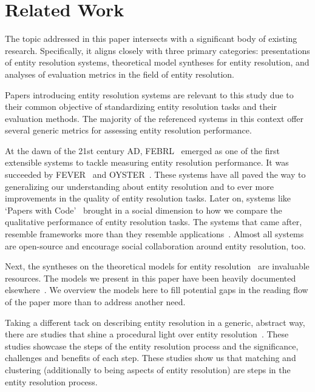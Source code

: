 \documentclass[journal]{IEEEtran}
\begin{document}
    \section{Related Work}\label{sec:Related Work}
    
    The topic addressed in this paper intersects with a significant body of
    existing research.
    Specifically, it aligns closely with three primary categories: presentations
    of entity resolution systems, theoretical model syntheses for entity
    resolution, and analyses of evaluation metrics in the field of entity
    resolution.

    Papers introducing entity resolution systems are relevant to this study due
    to their common objective of standardizing entity resolution tasks and their
    evaluation methods.
    The majority of the referenced systems in this context offer several generic
    metrics for assessing entity resolution performance.

    At the dawn of the 21st century AD, FEBRL~\cite{febrl2002} emerged as one of
    the first extensible systems to tackle measuring entity resolution
    performance.
    It was succeeded by FEVER~\cite{fever2009} and OYSTER~\cite{oyster2012}.
    These systems have all paved the way to generalizing our understanding about
    entity resolution and to ever more improvements in the quality of entity
    resolution tasks.
    Later on, systems like `Papers with Code'~\cite{papwithcode2019} brought in
    a social dimension to how we compare the qualitative performance of entity
    resolution tasks.
    The systems that came after, resemble frameworks more than they resemble
    applications~\cite{magellan2020,jedai2017}.
    Almost all systems are open-source and encourage social collaboration around
    entity resolution, too.
    
    Next, the syntheses on the theoretical models for entity
    resolution~\cite{fs1969,Ben2009Swoosh,Tal11} are invaluable resources.
    The models we present in this paper have been heavily documented
    elsewhere~\cite{Tal11,tal2013}.    
    We overview the models here to fill potential gaps in the reading flow of
    the paper more than to address another need.
    
    Taking a different tack on describing entity resolution in a generic,
    abstract way, there are studies that shine a procedural light over entity
    resolution~\cite{Pap19,Chen09}.
    These studies showcase the steps of the entity resolution process and the
    significance, challenges and benefits of each step.
    These studies show us that matching and clustering (additionally to being
    aspects of entity resolution) are steps in the entity resolution process.
\end{document}
